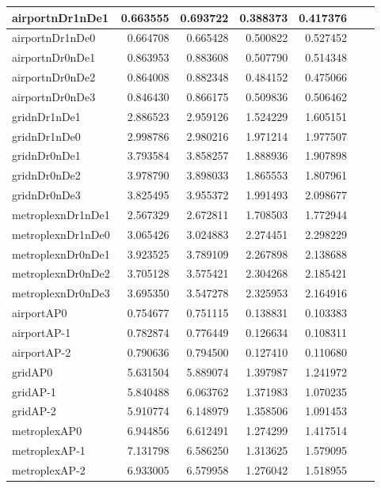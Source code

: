 \begin{longtable}{|l|r|r|r|r|r|r|}
\endlastfoot
airportnDr1nDe1 & 0.663555 & 0.693722 & 0.388373 & 0.417376 \\ \hline
airportnDr1nDe0 & 0.664708 & 0.665428 & 0.500822 & 0.527452 \\ \hline
airportnDr0nDe1 & 0.863953 & 0.883608 & 0.507790 & 0.514348 \\ \hline
airportnDr0nDe2 & 0.864008 & 0.882348 & 0.484152 & 0.475066 \\ \hline
airportnDr0nDe3 & 0.846430 & 0.866175 & 0.509836 & 0.506462 \\ \hline
gridnDr1nDe1 & 2.886523 & 2.959126 & 1.524229 & 1.605151 \\ \hline
gridnDr1nDe0 & 2.998786 & 2.980216 & 1.971214 & 1.977507 \\ \hline
gridnDr0nDe1 & 3.793584 & 3.858257 & 1.888936 & 1.907898 \\ \hline
gridnDr0nDe2 & 3.978790 & 3.898033 & 1.865553 & 1.807961 \\ \hline
gridnDr0nDe3 & 3.825495 & 3.955372 & 1.991493 & 2.098677 \\ \hline
metroplexnDr1nDe1 & 2.567329 & 2.672811 & 1.708503 & 1.772944 \\ \hline
metroplexnDr1nDe0 & 3.065426 & 3.024883 & 2.274451 & 2.298229 \\ \hline
metroplexnDr0nDe1 & 3.923525 & 3.789109 & 2.267898 & 2.138688 \\ \hline
metroplexnDr0nDe2 & 3.705128 & 3.575421 & 2.304268 & 2.185421 \\ \hline
metroplexnDr0nDe3 & 3.695350 & 3.547278 & 2.325953 & 2.164916 \\ \hline
airportAP0 & 0.754677 & 0.751115 & 0.138831 & 0.103383 \\ \hline
airportAP-1 & 0.782874 & 0.776449 & 0.126634 & 0.108311 \\ \hline
airportAP-2 & 0.790636 & 0.794500 & 0.127410 & 0.110680 \\ \hline
gridAP0 & 5.631504 & 5.889074 & 1.397987 & 1.241972 \\ \hline
gridAP-1 & 5.840488 & 6.063762 & 1.371983 & 1.070235 \\ \hline
gridAP-2 & 5.910774 & 6.148979 & 1.358506 & 1.091453 \\ \hline
metroplexAP0 & 6.944856 & 6.612491 & 1.274299 & 1.417514 \\ \hline
metroplexAP-1 & 7.131798 & 6.586250 & 1.313625 & 1.579095 \\ \hline
metroplexAP-2 & 6.933005 & 6.579958 & 1.276042 & 1.518955 \\ \hline

\end{longtable}
